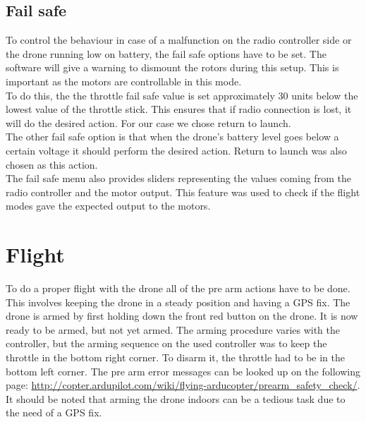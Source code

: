 \subsection*{Fail safe}
To control the behaviour in case of a malfunction on the radio controller side or the drone running
low on battery, the fail safe options have to be set. The software will give a warning to dismount
the rotors during this setup. This is important as the motors are controllable in this mode.\\
To do this, the the throttle fail safe value is set approximately 30 units below the lowest value of the
throttle stick. This ensures that if radio connection is lost, it will do the desired action. For
our case we chose return to launch.\\
The other fail safe option is that when the drone's battery level goes below a certain voltage it should
perform the desired action. Return to launch was also chosen as this action.\\
The fail safe menu also provides sliders representing the values coming from the radio controller
and the motor output. This feature was used to check if the flight modes gave the expected output
to the motors.

\section{Flight}
To do a proper flight with the drone all of the pre arm actions have to be done. This involves
keeping the drone in a steady position and having a GPS fix. The drone is armed by first
holding down the front red button on the drone. It is now ready to be armed, but not yet armed.
The arming procedure varies with the controller, but the arming sequence on the used controller
was to keep the throttle in the bottom right corner. To disarm it, the throttle had to be in the
bottom
left corner. The pre arm error messages can be looked up on the following page:
\url{http://copter.ardupilot.com/wiki/flying-arducopter/prearm_safety_check/}. It should be noted
that arming the drone indoors can be a tedious task due to the need of a GPS fix.\\

